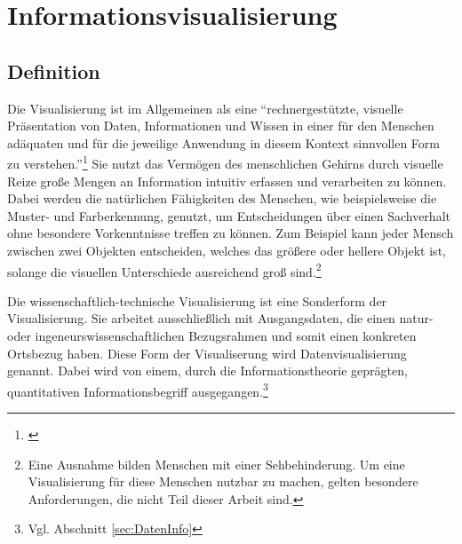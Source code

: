 \documentclass[a4paper, 
               12pt,
               DIV=calc,
               version=first,
               pdftex,
               headsepline,
               footsepline,
               bibtotocnumbered,
               liststotocnumbered]{scrreprt}
\begin{document}
\chapter{Informationsvisualisierung}
\label{cha:Informationsvisualisierung}
\section{Definition}
\label{sec:Definition}
Die Visualisierung ist im Allgemeinen als eine "`rechnergestützte, visuelle Präsentation von Daten, Informationen und Wissen
in einer für den Menschen adäquaten und für die jeweilige Anwendung in diesem Kontext sinnvollen Form
zu verstehen."'\footnote{\citep[S.\,3]{Schumann}}
Sie nutzt das Vermögen des menschlichen Gehirns durch visuelle Reize große Mengen an Information
intuitiv erfassen und verarbeiten zu können. Dabei werden die natürlichen Fähigkeiten des Menschen,
wie beispielsweise die Muster- und Farberkennung, genutzt, um Entscheidungen über
einen Sachverhalt ohne besondere Vorkenntnisse treffen zu können. Zum Beispiel kann jeder Mensch zwischen zwei Objekten entscheiden,
welches das größere oder hellere Objekt ist, solange die visuellen Unterschiede ausreichend groß sind.\footnote{
Eine Ausnahme bilden Menschen mit einer Sehbehinderung. Um eine Visualisierung für diese Menschen
nutzbar zu machen, gelten besondere Anforderungen, die nicht Teil dieser Arbeit sind.}

Die wissenschaftlich-technische Visualisierung ist eine Sonderform der Visualisierung. Sie arbeitet ausschließlich mit Ausgangsdaten,
die einen natur- oder ingeneurswissenschaftlichen Bezugsrahmen und somit einen konkreten Ortsbezug haben. Diese Form der
Visualiserung wird Datenvisualisierung genannt. Dabei wird von einem, durch die Informationstheorie
geprägten, quantitativen Informationsbegriff ausgegangen.\footnote{Vgl. 
Abschnitt \ref{sec:DatenInfo}}
\end{document}
